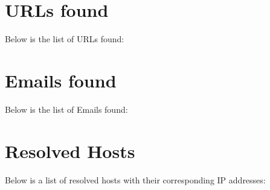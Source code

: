 \documentclass{article}
\begin{document}
\clearpage


\section{URLs found}

Below is the list of URLs found:


\clearpage

\section{Emails found}

Below is the list of Emails found:


\clearpage

\section{Resolved Hosts}

Below is a list of resolved hosts with their corresponding IP addresses:


\clearpage
\end{document}
